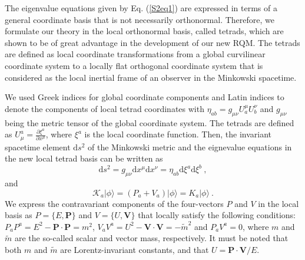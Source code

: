 \documentclass[12pt]{iopart}
\begin{document}
The eigenvalue equations given by Eq. (\ref{S2eq1}) are expressed in 
terms of a general coordinate basis that is not necessarily orthonormal. 
Therefore, we formulate our theory in the local orthonormal basis, called 
tetrads, which are shown to be of great advantage in the development 
of our new RQM.  The tetrads are defined as local coordinate transformations 
from a global curvilinear coordinate system to a locally flat orthogonal 
coordinate system that is considered as the local inertial frame of an
observer in the Minkowski spacetime. 

We used Greek indices for global coordinate components and Latin indices 
to denote the components of local tetrad coordinates with $\eta_{ab}=
g_{\mu\nu}U_a^\mu U_b^\nu$ and $g_{\mu \nu}$ being 
the metric tensor of the global coordinate system. The tetrads are 
defined as $U^a_\mu=\frac{\partial\xi^a}{\partial x^\mu}$, where 
$\xi^a$ is the local coordinate function.  Then, the invariant spacetime 
element $\mathrm{d}s^2$ of the Minkowski metric and the eignevalue 
equations in the new local tetrad basis can be written as
%
    \begin{equation}
        \mathrm{d}s^2=g_{\mu\nu}\mathrm{d}x^\mu\mathrm{d}x^\nu=
        \eta_{ab}\mathrm{d}\xi^a\mathrm{d}\xi^b\ ,
        \label{S2eq2}
    \end{equation}
%
and
%
    \begin{equation}
        \mathcal{K}_a\vert\phi\rangle=\left(P_a+V_a\right)\vert\phi\rangle=
        K_a\vert\phi\rangle\ .
        \label{S2eq3}
    \end{equation}
%
We express the contravariant components of the four-vectors $P$ and $V$ 
in the local basis as $P=\{E,\boldsymbol{P}\}$ and $V=\{U,\boldsymbol{V}\}$ 
that locally satisfy the following conditions: $P_a P^a = 
E^2-\boldsymbol{P}\cdot\boldsymbol{P}=m^2$, $V_a V^a = U^2-
\boldsymbol{V}\cdot\boldsymbol{V}=-\tilde{m}^2$ and $P_a V^a =0$,
where $m$ and $\tilde{m}$ are the so-called scalar and vector mass, 
respectively.  It must be noted that both $m$ and $\tilde{m}$ are 
Lorentz-invariant constants, and that $U=\boldsymbol{P}\cdot\boldsymbol{V}/E$.
\end{document}
